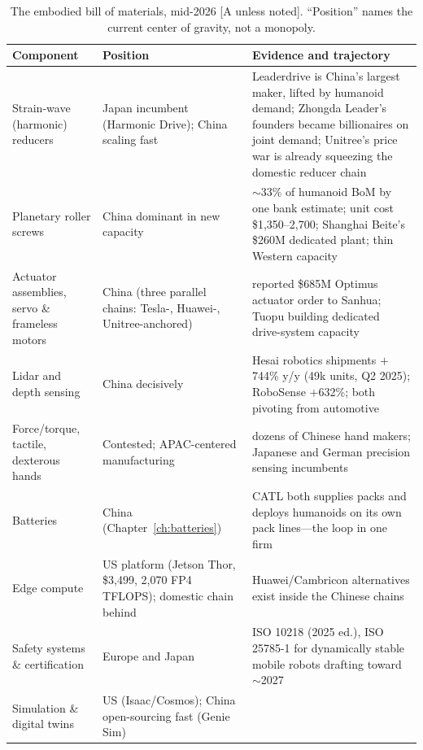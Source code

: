 \begin{table}[htbp]
  \centering
  \scriptsize
  \caption{The embodied bill of materials, mid-2026 [A unless noted]. ``Position'' names the current center of gravity, not a monopoly.}
  \label{tab:embodied-bom}
  \setlength{\tabcolsep}{3.5pt}
  \begin{tabular}{p{30mm}p{52mm}p{54mm}}
    \toprule
    Component & Position & Evidence and trajectory \\
    \midrule
    Strain-wave (harmonic) reducers & Japan incumbent (Harmonic Drive); China scaling fast & Leaderdrive is China's largest maker, lifted by humanoid demand; Zhongda Leader's founders became billionaires on joint demand; Unitree's price war is already squeezing the domestic reducer chain~\cite{reducers} \\
    \addlinespace
    Planetary roller screws & China dominant in new capacity & $\sim$33\% of humanoid BoM by one bank estimate; unit cost \$1,350--2,700; Shanghai Beite's \$260M dedicated plant; thin Western capacity~\cite{roller-screws} \\
    \addlinespace
    Actuator assemblies, servo \& frameless motors & China (three parallel chains: Tesla-, Huawei-, Unitree-anchored) & reported \$685M Optimus actuator order to Sanhua; Tuopu building dedicated drive-system capacity~\cite{tesla-suppliers} \\
    \addlinespace
    Lidar and depth sensing & China decisively & Hesai robotics shipments $+$744\% y/y (49k units, Q2 2025); RoboSense $+$632\%; both pivoting from automotive~\cite{lidar-robotics} \\
    \addlinespace
    Force/torque, tactile, dexterous hands & Contested; APAC-centered manufacturing & dozens of Chinese hand makers; Japanese and German precision sensing incumbents \\
    \addlinespace
    Batteries & China (Chapter~\ref{ch:batteries}) & CATL both supplies packs and deploys humanoids on its own pack lines---the loop in one firm~\cite{catl-galbot} \\
    \addlinespace
    Edge compute & US platform (Jetson Thor, \$3,499, 2{,}070 FP4 TFLOPS); domestic chain behind & Huawei/Cambricon alternatives exist inside the Chinese chains~\cite{jetson-thor} \\
    \addlinespace
    Safety systems \& certification & Europe and Japan & ISO 10218 (2025 ed.), ISO 25785-1 for dynamically stable mobile robots drafting toward $\sim$2027~\cite{iso-humanoid} \\
    \addlinespace
    Simulation \& digital twins & US (Isaac/Cosmos); China open-sourcing fast (Genie Sim) & \cite{cosmos,agibot-world} \\
    \bottomrule
  \end{tabular}
\end{table}

